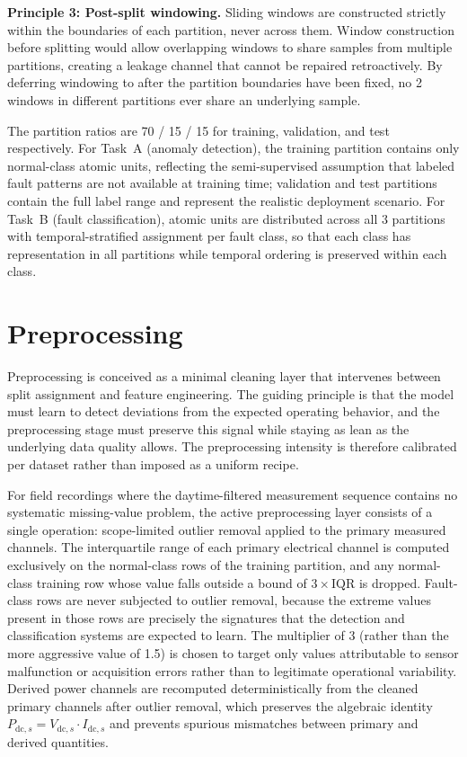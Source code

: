 \textbf{Principle 3: Post-split windowing.} Sliding windows are constructed strictly within the boundaries of each partition, never across them. Window construction before splitting would allow overlapping windows to share samples from multiple partitions, creating a leakage channel that cannot be repaired retroactively. By deferring windowing to after the partition boundaries have been fixed, no 2 windows in different partitions ever share an underlying sample.

The partition ratios are 70 / 15 / 15 for training, validation, and test respectively. For Task~A (anomaly detection), the training partition contains only normal-class atomic units, reflecting the semi-supervised assumption that labeled fault patterns are not available at training time; validation and test partitions contain the full label range and represent the realistic deployment scenario. For Task~B (fault classification), atomic units are distributed across all 3 partitions with temporal-stratified assignment per fault class, so that each class has representation in all partitions while temporal ordering is preserved within each class.

\section{Preprocessing}
\label{sec:preprocessing}

Preprocessing is conceived as a minimal cleaning layer that intervenes between split assignment and feature engineering. The guiding principle is that the model must learn to detect deviations from the expected operating behavior, and the preprocessing stage must preserve this signal while staying as lean as the underlying data quality allows. The preprocessing intensity is therefore calibrated per dataset rather than imposed as a uniform recipe.

For field recordings where the daytime-filtered measurement sequence contains no systematic missing-value problem, the active preprocessing layer consists of a single operation: scope-limited outlier removal applied to the primary measured channels. The interquartile range of each primary electrical channel is computed exclusively on the normal-class rows of the training partition, and any normal-class training row whose value falls outside a bound of $3 \times \mathrm{IQR}$ is dropped. Fault-class rows are never subjected to outlier removal, because the extreme values present in those rows are precisely the signatures that the detection and classification systems are expected to learn. The multiplier of 3 (rather than the more aggressive value of 1.5) is chosen to target only values attributable to sensor malfunction or acquisition errors rather than to legitimate operational variability. Derived power channels are recomputed deterministically from the cleaned primary channels after outlier removal, which preserves the algebraic identity $P_{\mathrm{dc},s} = V_{\mathrm{dc},s} \cdot I_{\mathrm{dc},s}$ and prevents spurious mismatches between primary and derived quantities.

